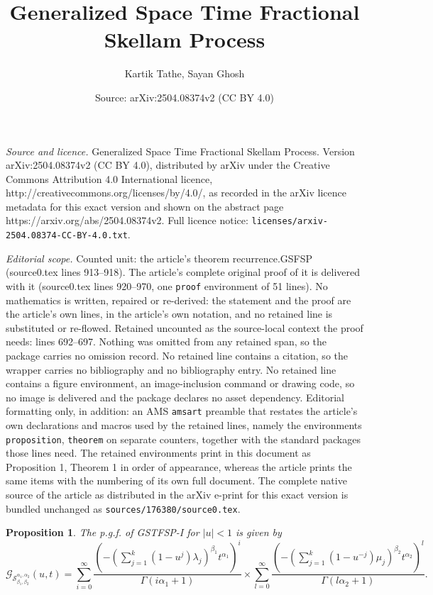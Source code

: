 \documentclass[10pt,a4paper]{amsart}
\title{Generalized Space Time Fractional Skellam Process}
\author{Kartik Tathe, Sayan Ghosh}
\date{Source: arXiv:2504.08374v2 (CC BY 4.0)}
\newtheorem{proposition}{Proposition}
\begin{document}
\maketitle

\noindent\emph{Source and licence.} Generalized Space Time Fractional Skellam Process. Version arXiv:2504.08374v2 (CC BY 4.0), distributed by arXiv under the Creative Commons Attribution 4.0 International licence, http://creativecommons.org/licenses/by/4.0/, as recorded in the arXiv licence metadata for this exact version and shown on the abstract page https://arxiv.org/abs/2504.08374v2. Full licence notice: \texttt{licenses/arxiv-2504.08374-CC-BY-4.0.txt}.\par\smallskip

\noindent\textit{Editorial scope.} Counted unit: the article's theorem recurrence.GSFSP (source0.tex lines 913--918). The article's complete original proof of it is delivered with it (source0.tex lines 920--970, one \texttt{proof} environment of 51 lines). No mathematics is written, repaired or re-derived: the statement and the proof are the article's own lines, in the article's own notation, and no retained line is substituted or re-flowed.  Retained uncounted as the source-local context the proof needs: lines 692--697.  Nothing was omitted from any retained span, so the package carries no omission record.  No retained line contains a citation, so the wrapper carries no bibliography and no bibliography entry.  No retained line contains a figure environment, an image-inclusion command or drawing code, so no image is delivered and the package declares no asset dependency.  Editorial formatting only, in addition: an AMS \texttt{amsart} preamble that restates the article's own declarations and macros used by the retained lines, namely the environments \texttt{proposition}, \texttt{theorem} on separate counters, together with the standard packages those lines need.  The retained environments print in this document as Proposition 1, Theorem 1 in order of appearance, whereas the article prints the same items with the numbering of its own full document.  The complete native source of the article as distributed in the arXiv e-print for this exact version is bundled unchanged as \texttt{sources/176380/source0.tex}.
\begin{proposition}\label{p.g.f._GSTFSP1}
    The p.g.f. of GSTFSP-I for $|u|<1$ is given by
    \begin{equation*}
        \mathcal{G}_{\mathcal{S}^{\alpha_1,\alpha_2}_{\beta_1,\beta_2}}(u,t)=\sum_{i=0}^{\infty}\frac{(-(\sum_{j=1}^{k}(1-u^j)\lambda_j)^{\beta_1} t^{\alpha_1})^i}{\Gamma(i{\alpha_1}+1)}\times\sum_{l=0}^{\infty}\frac{(-(\sum_{j=1}^{k}(1-u^{-j})\mu_j)^{\beta_2} t^{\alpha_2})^l}{\Gamma(l{\alpha_2}+1)}.
    \end{equation*}
\end{proposition}
\end{document}
